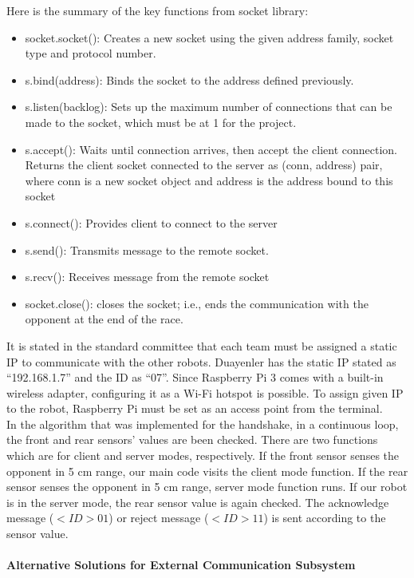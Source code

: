 \documentclass[a4paper,12pt]{article}
\begin{document}
	Here is the summary of the key functions from socket library:
	
	\begin{itemize}
		\item socket.socket(): Creates a new socket using the given address family, socket type and protocol number.
		\item s.bind(address): Binds the socket to the address defined previously.
		\item s.listen(backlog): Sets up the maximum number of connections that can be made to the socket, which must be at 1 for the project.
		\item	s.accept(): Waits until connection arrives, then accept the client connection. Returns the client socket connected to the server as (conn, address) pair, where conn is a new socket object and address is the address bound to this socket
		\item	s.connect(): Provides client to connect to the server
		\item	s.send(): Transmits message to the remote socket.
		\item	s.recv(): Receives message from the remote socket
		\item	socket.close(): closes the socket; i.e., ends the communication with the opponent at the end of the race.
	\end{itemize}
	
	It is stated in the standard committee that each team must be assigned a static IP to communicate with the other robots. Duayenler has the static IP stated as “192.168.1.7” and the ID as “07”. Since Raspberry Pi 3 comes with a built-in wireless adapter, configuring it as a Wi-Fi hotspot is possible. To assign given IP to the robot, Raspberry Pi must be set as an access point from the terminal.\\
	
	In the algorithm that was implemented for the handshake, in a continuous loop, the front and rear sensors' values are been checked. There are two functions which are for client and server modes, respectively. If the front sensor senses the opponent in 5 cm range, our main code visits the client mode function. If the rear sensor senses the opponent in 5 cm range, server mode function runs. If our robot is in the server mode, the rear sensor value is again checked. The acknowledge message ($< ID> 01$) or reject message ($< ID> 11$) is sent according to the sensor value.
	
	\paragraph{Alternative Solutions for External Communication Subsystem}
	
\end{document}
